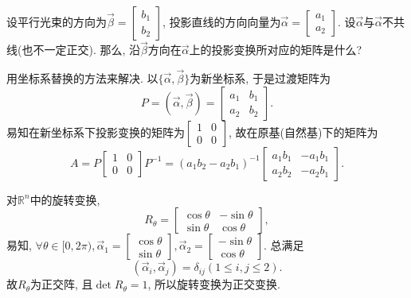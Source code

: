 \begin{eg}
设平行光束的方向为$\vec{\beta}=\begin{bmatrix}b_1\\b_2\end{bmatrix}$, 投影直线的方向向量为$\vec{\alpha}=\begin{bmatrix}a_1\\a_2\end{bmatrix}$. 设$\vec{\alpha}$与$\vec{\alpha}$不共线(也不一定正交). 那么, 沿$\vec{\beta}$方向在$\vec{\alpha}$上的投影变换所对应的矩阵是什么?

用坐标系替换的方法来解决. 以$\{\vec{\alpha},\vec{\beta}\}$为新坐标系, 于是过渡矩阵为
$$P=(\vec{\alpha},\vec{\beta})=\begin{bmatrix}a_1&b_1\\a_2&b_2\end{bmatrix}.$$
易知在新坐标系下投影变换的矩阵为$\begin{bmatrix}1&0\\0&0\end{bmatrix}$, 故在原基(自然基)下的矩阵为
$$A=P\begin{bmatrix}1&0\\0&0\end{bmatrix}P^{-1}=(a_1b_2-a_2b_1)^{-1}\begin{bmatrix}
a_1b_1&-a_1b_1\\a_2b_2&-a_2b_1\end{bmatrix}.$$
\end{eg}

\begin{eg}
对$\mathbb{R}^n$中的旋转变换,
$$R_{\theta}=\begin{bmatrix}\cos\theta&-\sin\theta\\ \sin\theta &\cos\theta\end{bmatrix},$$
易知, $\forall \theta\in [0, 2\pi), \vec{\alpha}_1=\begin{bmatrix} \cos\theta\\ \sin\theta\end{bmatrix}, \vec{\alpha}_2=\begin{bmatrix} -\sin\theta\\ \cos\theta\end{bmatrix}.$ 总满足
$$(\vec{\alpha}_i, \vec{\alpha}_j)=\delta_{ij}(1\leq i, j\leq 2).$$
故$R_{\theta}$为正交阵, 且$\det R_{\theta}=1$, 所以旋转变换为正交变换.
\end{eg}

